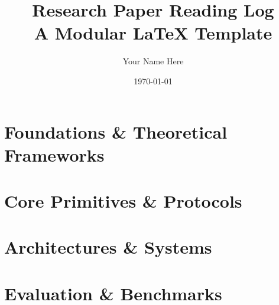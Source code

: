 \documentclass[11pt,a4paper]{report}
\title{Research Paper Reading Log\\\large A Modular LaTeX Template}
\author{Your Name Here}
\date{\today}
\begin{document}
\maketitle
\tableofcontents
\newpage


\chapter{Foundations \& Theoretical Frameworks}



\chapter{Core Primitives \& Protocols}
% 


\chapter{Architectures \& Systems}
% 


\chapter{Evaluation \& Benchmarks}
% 


\newpage
\printbibliography[heading=bibintoc, title={References}]
\end{document}
